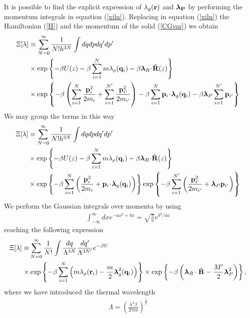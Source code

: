 \documentclass[b5paper,openright,10pt]{book}
\newcommand{\esc}{\!\cdot\!}
\begin{document}
It is possible to find the explicit expression of $\lambda_{g}({\bf r})$ and $\boldsymbol{\lambda}_{\bf P}$ by performing the momentum integrals in equation (\ref{xiln}). Replacing in equation (\ref{xiln}) the Hamiltonian (\ref{H}) and the momentum of the solid (\ref{CGvar}) we obtain 
\begin{align}
\Xi[\lambda]
&\equiv
\sum_{N=0}^\infty \frac{1}{N!h^{3N}}
\int dqdpdq'dp'
\nonumber \\
&\times\exp\left\{-\beta U(z)-\beta \sum_{i=1}^Nm\lambda_\rho({\bf
    q}_i) -\beta \boldsymbol{\lambda}_{R}\esc\hat{\bf R}(z) \right\}
\nonumber \\
&\times
\exp\left\{-\beta \left(\sum_{i=1}^N\frac{{\bf p}_i^2}{2m_i} + \sum_{i=1}^{N'}\frac{{\bf p}_{i'}^2}{2m_{i'}} \right) - \beta \sum_{i=1}^N{\bf p}_i\esc\boldsymbol{\lambda}_g({\bf q}_i) 
-\beta \boldsymbol{\lambda}_P\sum_{i=1}^{N'}{\bf p}_{i'}\right\}
\end{align}
We may group the terms in this way
\begin{align}
\Xi[\lambda]
&\equiv
\sum_{N=0}^\infty \frac{1}{N!h^{3N}}
\int dqdpdq'dp'
\nonumber \\
&\times\exp\left\{-\beta U(z)-\beta \sum_{i=1}^Nm\lambda_\rho({\bf
    q}_i) -\beta \boldsymbol{\lambda}_{R}\esc\hat{\bf R}(z) \right\}
\nonumber \\
&\times
\exp\left\{-\beta \sum_{i=1}^N\left(\frac{{\bf p}_i^2}{2m_i} + {\bf p}_i\esc\boldsymbol{\lambda}_g({\bf q}_i)\right)\right\}
\exp\left\{-\beta \sum_{i=1}^{N'}\left(\frac{{\bf p}_{i'}^2}{2m_{i'}} + \boldsymbol{\lambda}_P{\bf p}_{i'}\right) \right\}
\end{align}
We perform the Gaussian integrals over momenta by using 
\begin{align}
\int_{-\infty}^{\infty} dx e^{-ax^2+bx}=\sqrt{\frac{\pi}{a}}e^{b^2/4a} 
\end{align}
reaching the following expression 
\begin{align}
\Xi [\lambda]
    \equiv&
 \sum_{N=0}^\infty \frac{1}{N!}
\int \frac{dq}{\Lambda^{3N}}\frac{dq'}{\Lambda^{3N'}}e^{-\beta U}
\nonumber\\
\times&\exp\left\{-\beta \sum_{i=1}^N\left(m\lambda_\rho({\bf
    r}_i)-\frac{m}{2}\boldsymbol{\lambda}_{g}^2({\bf q}_i)\right)\right\}
    \times\exp\left\{-\beta \left(\boldsymbol{\lambda}_R\cdot\hat{\bf R}-\frac{M'}{2}\boldsymbol{\lambda}_{P}^2\right)\right\},
\label{xiln2}
\end{align}
where we have introduced the thermal wavelength  
\begin{align}
\Lambda=\left(\frac{h^2\beta}{2\pi m}\right)^{\frac{1}{2}}
\label{ThermalWave}
\end{align}
\end{document}
